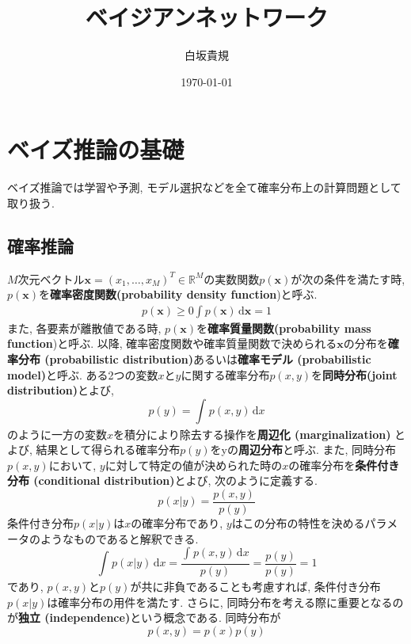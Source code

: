 \documentclass[twocolumn]{jarticle}
\title{ベイジアンネットワーク}
\author{白坂貴規}
\date{\today}
\begin{document}
\maketitle

\section{ベイズ推論の基礎}
ベイズ推論では学習や予測, モデル選択などを全て確率分布上の計算問題として取り扱う.
\subsection{確率推論}
${M}$次元ベクトル${\bm {x} = (x_1, \dots, x_M)^T \in \mathbb{R}^M}$の実数関数${p(\bm {x})}$が次の条件を満たす時, ${p(\bm {x})}$を{\bf 確率密度関数(probability density function})と呼ぶ.
\begin{eqnarray}
  p(\bm {x}) \geq 0
  \int p(\bm {x}) \, \mathrm{d}{\bm {x}} = 1
\end{eqnarray}
また, 各要素が離散値である時, ${p(\bm {x})}$を{\bf 確率質量関数(probability mass function})と呼ぶ. 以降, 確率密度関数や確率質量関数で決められる${\bm {x}}$の分布を{\bf 確率分布 (probabilistic distribution)}あるいは{\bf 確率モデル (probabilistic model)}と呼ぶ.
ある2つの変数${x}$と${y}$に関する確率分布${p(x, y)}$を{\bf 同時分布(joint distribution)}とよび,
\begin{equation}
  p(y) = \int_{}^{} p(x, y) \,\mathrm{d}x
\end{equation}
のように一方の変数${x}$を積分により除去する操作を{\bf 周辺化 (marginalization)} とよび, 結果として得られる確率分布${p(y)}$をyの{\bf 周辺分布}と呼ぶ. また, 同時分布${p(x, y)}$において, ${y}$に対して特定の値が決められた時の${x}$の確率分布を{\bf 条件付き分布 (conditional distribution)}とよび, 次のように定義する.
\begin{equation}
  p(x|y) = \frac{p(x, y)}{p(y)}
\end{equation}
条件付き分布${p(x|y)}$は${x}$の確率分布であり, ${y}$はこの分布の特性を決めるパラメータのようなものであると解釈できる.
\begin{equation}
  \int_{}^{} p(x|y) \,\mathrm{d}x = \frac{\int_{}^{} p(x, y) \,\mathrm{d}x}{p(y)} = \frac{p(y)}{p(y)} = 1
\end{equation}
であり, ${p(x, y)}$と${p(y)}$が共に非負であることも考慮すれば, 条件付き分布${p(x|y)}$は確率分布の用件を満たす.
さらに, 同時分布を考える際に重要となるのが{\bf 独立 (independence)}という概念である. 同時分布が
\begin{equation}
  p(x, y) = p(x)p(y)
\end{equation}
\end{document}
